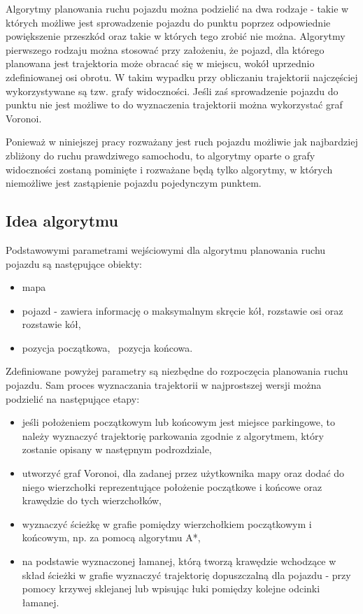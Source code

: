 \documentclass[a4paper,11pt,twoside]{report}
\theoremstyle{definition}
\begin{document}
Algorytmy planowania ruchu pojazdu można podzielić na dwa rodzaje - takie w których możliwe jest sprowadzenie pojazdu do punktu poprzez odpowiednie powiększenie przeszkód oraz takie w których tego zrobić nie można. Algorytmy pierwszego rodzaju można stosować przy założeniu, że pojazd, dla którego planowana jest trajektoria może obracać się w miejscu, wokół uprzednio zdefiniowanej osi obrotu. W takim wypadku przy obliczaniu trajektorii najczęściej wykorzystywane są tzw. grafy widoczności. Jeśli zaś sprowadzenie pojazdu do punktu nie jest możliwe to do wyznaczenia trajektorii można wykorzystać graf Voronoi.

Ponieważ w niniejszej pracy rozważany jest ruch pojazdu możliwie jak najbardziej zbliżony do ruchu prawdziwego samochodu, to algorytmy oparte o grafy widoczności zostaną pominięte i rozważane będą tylko algorytmy, w których niemożliwe jest zastąpienie pojazdu pojedynczym punktem.

\subsection{Idea algorytmu}

Podstawowymi parametrami wejściowymi dla algorytmu planowania ruchu pojazdu są następujące obiekty:
\begin{itemize}
	\item mapa
	\item pojazd - zawiera informację o maksymalnym skręcie kół, rozstawie osi oraz rozstawie kół,
	\item pozycja początkowa,
	\ pozycja końcowa.
\end{itemize}

Zdefiniowane powyżej parametry są niezbędne do rozpoczęcia planowania ruchu pojazdu. Sam proces wyznaczania trajektorii w najprostszej wersji można podzielić na następujące etapy:
\begin{itemize}
	\item jeśli położeniem początkowym lub końcowym jest miejsce parkingowe, to należy wyznaczyć trajektorię parkowania zgodnie z algorytmem, który zostanie opisany w następnym podrozdziale,
	\item utworzyć graf Voronoi, dla zadanej przez użytkownika mapy oraz dodać do niego wierzchołki reprezentujące położenie początkowe i końcowe oraz krawędzie do tych wierzchołków,
	\item wyznaczyć ścieżkę w grafie pomiędzy wierzchołkiem początkowym i końcowym, np. za pomocą algorytmu A*,
	\item na podstawie wyznaczonej łamanej, którą tworzą krawędzie wchodzące w skład ścieżki w grafie wyznaczyć trajektorię dopuszczalną dla pojazdu - przy pomocy krzywej sklejanej lub wpisując łuki pomiędzy kolejne odcinki łamanej.
\end{itemize}
\end{document}
